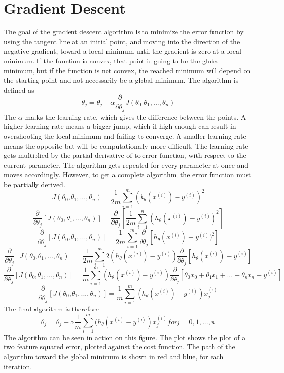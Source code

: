 \documentclass[a4paper,12pt]{article}
\begin{document}
\section{Gradient Descent}
The goal of the gradient descent algorithm is to minimize the error function by using the tangent line at an initial point, and moving into the direction of the negative gradient, toward a local minimum until the gradient is zero at a local minimum. If the function is convex, that point is going to be the global minimum, but if the function is not convex, the reached minimum will depend on the starting point and not necessarily be a global minimum. The algorithm is defined as \[\theta_j = \theta_j - \alpha \frac{\partial}{\partial\theta_j} J(\theta_0, \theta_1, ..., \theta_n)\] The \(\alpha\) marks the learning rate, which gives the difference between the points. A higher learning rate means a bigger jump, which if high enough can result in overshooting the local minimum and failing to converge. A smaller learning rate means the opposite but will be computationally more difficult. The learning rate gets multiplied by the partial derivative of to error function, with respect to the current parameter. The algorithm gets repeated for every parameter at once and moves accordingly. However, to get a complete algorithm, the error function must be partially derived. 
\[J(\theta_0, \theta_1, ..., \theta_n) = \frac{1}{2m} \sum_{i=1}^m (h_\theta(x^{(i)}) - y^{(i)})^2\]
\[\frac{\partial}{\partial\theta_j} [J(\theta_0, \theta_1, ..., \theta_n)] = \frac{\partial}{\partial\theta_j} [\frac{1}{2m} \sum_{i=1}^m (h_\theta(x^{(i)}) - y^{(i)})^2]\]
\[\frac{\partial}{\partial\theta_j} [J(\theta_0, \theta_1, ..., \theta_n)] = \frac{1}{2m} \sum_{i=1}^m \frac{\partial}{\partial\theta_j} [h_\theta(x^{(i)}) - y^{(i)})^2]\]
\[\frac{\partial}{\partial\theta_j} [J(\theta_0, \theta_1, ..., \theta_n)] = \frac{1}{2m} \sum_{i=1}^m 2(h_\theta(x^{(i)}) - y^{(i)}) \frac{\partial}{\partial\theta_j}[h_\theta(x^{(i)}) - y^{(i)}]\]
\[\frac{\partial}{\partial\theta_j} [J(\theta_0, \theta_1, ..., \theta_n)] = \frac{1}{m} \sum_{i=1}^m (h_\theta(x^{(i)}) - y^{(i)})\frac{\partial}{\partial\theta_j} [\theta_0x_0+\theta_1x_1+...+\theta_nx_n-y^{(i)}]\]
\[\frac{\partial}{\partial\theta_j} [J(\theta_0, \theta_1, ..., \theta_n)] = \frac{1}{m} \sum_{i=1}^m (h_\theta(x^{(i)}) - y^{(i)})x_j^{(i)}\]
The final algorithm is therefore
\[\theta_j = \theta_j - \alpha \frac{1}{m} \sum_{i=1}^m (h_\theta(x^{(i)} - y^{(i)})x_j^{(i)} for j = 0,1,...,n\]
The algorithm can be seen in action on this figure. The plot shows the plot of a two feature squared error, plotted against the cost function. The path of the algorithm toward the global minimum is shown in red and blue, for each iteration. 
\end{document}
